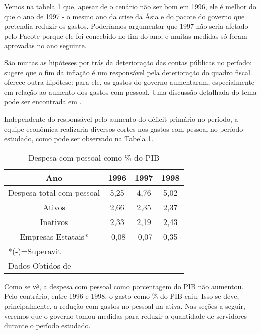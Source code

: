 \documentclass{article}
\begin{document}
Vemos na tabela 1 que, apesar de o cenário não ser bom em 1996, ele é melhor do que o ano de 1997 - o mesmo ano da crise da Ásia e do pacote do governo que pretendia reduzir os gastos. Poderíamos argumentar que 1997 não seria afetado pelo Pacote porque ele foi concebido no fim do ano, e muitas medidas só foram aprovadas no ano seguinte. %

São muitas as hipóteses por trás da deterioração das contas públicas no período: \citet{Werneck2014} sugere que o fim da inflação é um responsável pela deterioração do quadro fiscal. \citet{Giambiagi2002} oferece outra hipótese: para ele, os gastos do governo aumentaram, especialmente em relação ao aumento dos gastos com pessoal. Uma discussão detalhada do tema pode ser encontrada em \citet{Grossmann1998}.

Independente do responsável pelo aumento do déficit primário no período, a equipe econômica realizaria diversos cortes nos gastos com pessoal no período estudado, como pode ser observado na Tabela \ref{tab:DepesaPessoal}.

\begin{table}[h]
\begin{center}
\begin{tabular}[c]{|c|c|c|c|}
\hline
Ano & 1996 & 1997 & 1998\\ \hline
Despesa total com pessoal & 5,25 & 4,76 & 5,02 \\ \hline
Ativos & 2,66 & 2,35 & 2,37\\ \hline
Inativos & 2,33 & 2,19 & 2,43 \\ \hline
Empresas Estatais* & -0,08 & -0,07 & 0,35 \\ \hline
\multicolumn{4}{l}{*(-)=Superavit} \\
\multicolumn{4}{l}{Dados Obtidos de \citet{Giambiagi2002}} \\
\end{tabular}
\caption{Despesa com pessoal como \% do PIB} \label{tab:DepesaPessoal} %
\end{center}
\end{table}

Como se vê, a despesa com pessoal como porcentagem do PIB não aumentou. Pelo contrário, entre 1996 e 1998, o gasto como \% do PIB caiu. Isso se deve, principalmente, a redução com gastos no pessoal na ativa. Nas seções a seguir, veremos que o governo tomou medidas para reduzir a quantidade de servidores durante o período estudado.
\end{document}
